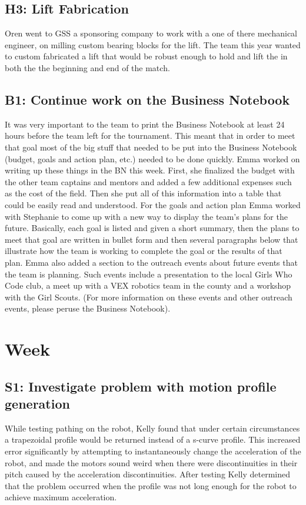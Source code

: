 \documentclass{article}
\begin{document}
\subsection{H3: Lift Fabrication}

Oren went to GSS a sponsoring company to work with a one of there mechanical engineer, on milling custom bearing blocks for the lift. The team this year wanted to custom fabricated a lift that would be robust enough to hold and lift the in both the the beginning and end of the match. 
\subsection{B1: Continue work on the Business Notebook}

It was very important to the team to print the Business Notebook at least 24 hours before the team left for the tournament. This meant that in order to meet that goal most of the big stuff that needed to be put into the Business Notebook (budget, goals and action plan, etc.) needed to be done quickly. Emma worked on writing up these things in the BN this week. First, she finalized the budget with the other team captains and mentors and added a few additional expenses such as the cost of the field. Then she put all of this information into a table that could be easily read and understood. For the goals and action plan Emma worked with Stephanie to come up with a new way to display the team's plans for the future. Basically, each goal is listed and given a short summary, then the plans to meet that goal are written in bullet form and then several paragraphs below that illustrate how the team is working to complete the goal or the results of that plan. Emma also added a section to the outreach events about future events that the team is planning. Such events include a presentation to the local Girls Who Code club, a meet up with a VEX robotics team in the county and a workshop with the Girl Scouts. (For more information on these events and other outreach events, please peruse the Business Notebook). 
\clearpage \newpage \section{Week \thesection} 
\subsection{S1: Investigate problem with motion profile generation}

While testing pathing on the robot, Kelly found that under certain circumstances a trapezoidal profile would be returned instead of a s-curve profile. This increased error significantly by attempting to instantaneously change the acceleration of the robot, and made the motors sound weird when there were discontinuities in their pitch caused by the acceleration discontinuities. After testing Kelly determined that the problem occurred when the profile was not long enough for the robot to achieve maximum acceleration. 
\end{document}
